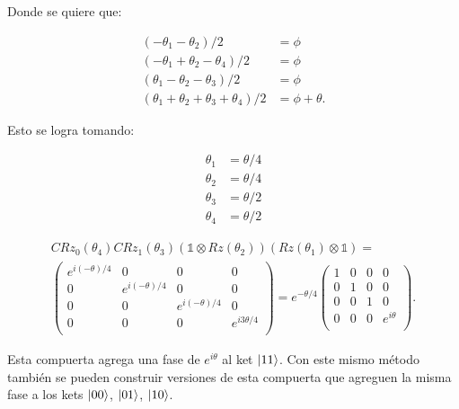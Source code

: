 Donde se quiere que:

\begin{align}
    (-\theta_1 - \theta_2)/2 &= \phi \\
    (-\theta_1+\theta_2-\theta_4)/2 &= \phi \\
    (\theta_1 - \theta_2 - \theta_3)/2 &= \phi \\
    (\theta_1 + \theta_2 + \theta_3 + \theta_4)/2 &= \phi + \theta .
\end{align}

Esto se logra tomando:

\begin{align}
    \theta_1 &= \theta/4\\
    \theta_2 &= \theta/4\\
    \theta_3 &= \theta/2\\
    \theta_4 &= \theta/2
\end{align}

\begin{multline}
    CRz_0(\theta_4) CRz_1(\theta_3) (\mathds{1} \otimes Rz(\theta_2)) (Rz(\theta_1) \otimes \mathds{1}) = \\
    \begin{pmatrix}
        e^{i(-\theta)/4} & 0 & 0 & 0 \\
        0 & e^{i(-\theta)/4} & 0 & 0 \\
        0 & 0 & e^{i(- \theta)/4} & 0 \\
        0 & 0 & 0 & e^{i 3\theta/4} \\
    \end{pmatrix} =
    e^{- \theta/4} \begin{pmatrix}
        1 & 0 & 0 & 0 \\
        0 & 1 & 0 & 0 \\
        0 & 0 & 1 & 0 \\
        0 & 0 & 0 & e^{i \theta} \\
    \end{pmatrix} .
\end{multline}

Esta compuerta agrega una fase de $e^{i \theta}$ al ket $\ket{11}$. Con este mismo método también se pueden construir versiones de esta compuerta que agreguen la misma fase a los kets $\ket{00}$, $\ket{01}$, $\ket{10}$.

